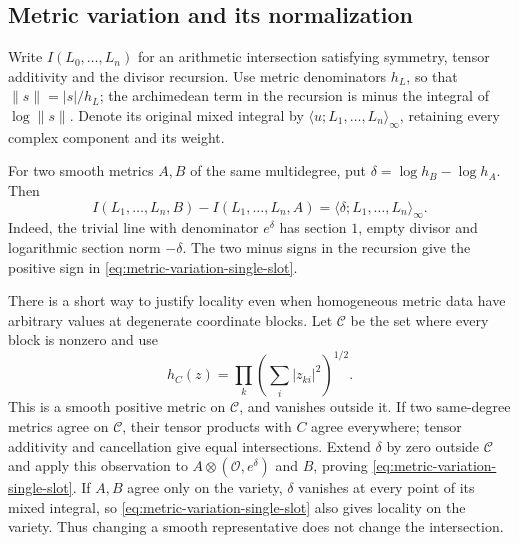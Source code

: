 \subsection{Metric variation and its normalization}
\label{sec:exact-arithmetic-metric-variation}

Write \(I(L_0,\ldots,L_n)\) for an arithmetic intersection satisfying
symmetry, tensor additivity and the divisor recursion.  Use metric
denominators \(h_L\), so that \(\|s\|=|s|/h_L\); the archimedean
term in the recursion is minus the integral of \(\log\|s\|\).
Denote its original mixed integral by
\(\langle u;L_1,\ldots,L_n\rangle_\infty\), retaining every complex
component and its weight.

For two smooth metrics \(A,B\) of the same multidegree, put
\(\delta=\log h_B-\log h_A\).  Then
\begin{equation}\label{eq:metric-variation-single-slot}
 I(L_1,\ldots,L_n,B)-I(L_1,\ldots,L_n,A)
       =\langle\delta;L_1,\ldots,L_n\rangle_\infty .
\end{equation}
Indeed, the trivial line with denominator \(e^\delta\) has section \(1\),
empty divisor and logarithmic section norm \(-\delta\).
The two minus signs in the recursion give the positive sign in
\eqref{eq:metric-variation-single-slot}.

There is a short way to justify locality even when homogeneous metric
data have arbitrary values at degenerate coordinate blocks.
Let \(\mathcal C\) be the set where every block is nonzero and use
\[
                    h_C(z)=\prod_k
                       \left(\sum_i|z_{ki}|^2\right)^{1/2}.
\]
This is a smooth positive metric on \(\mathcal C\), and vanishes
outside it.  If two same-degree metrics agree on \(\mathcal C\),
their tensor products with \(C\) agree everywhere; tensor additivity
and cancellation give equal intersections.  Extend \(\delta\) by zero
outside \(\mathcal C\) and apply this observation to
\(A\otimes(\mathcal O,e^\delta)\) and \(B\), proving
\eqref{eq:metric-variation-single-slot}.
If \(A,B\) agree only on the variety, \(\delta\) vanishes at every
point of its mixed integral, so \eqref{eq:metric-variation-single-slot}
also gives locality on the variety.
Thus changing a smooth representative does not change the intersection.

